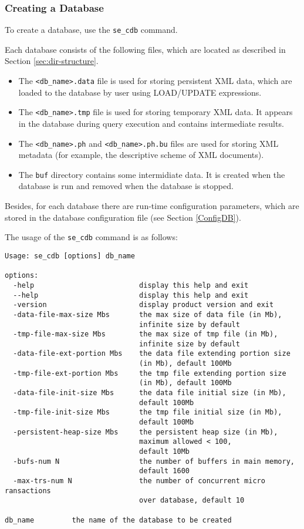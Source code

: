 \documentclass[a4paper,12pt]{article}
\begin{document}
\subsubsection{Creating a Database}
\label{CreateDB}
To create a database, use the \verb!se_cdb! command.

Each database consists of the following files, which are located as described in Section \ref{sec:dir-structure}.

\begin{itemize}
\item The \verb!<db_name>.data! file is used for storing persistent XML data, which are loaded to the database by user using LOAD/UPDATE expressions. 
\item The \verb!<db_name>.tmp! file is used for storing temporary XML data. It appears in the database during query execution and contains intermediate results.
\item The \verb!<db_name>.ph! and \verb!<db_name>.ph.bu! files are used for storing XML metadata (for example, the descriptive scheme of XML documents).
\item The \verb!buf! directory contains some intermidiate data. It is created when the database is run and removed when the database is stopped.
\end{itemize}

Besides, for each database there are run-time configuration parameters, which are stored in the database configuration file (see Section \ref{ConfigDB}).

The usage of the \verb!se_cdb! command is as follows:

\begin{verbatim}
Usage: se_cdb [options] db_name

options:
  -help                         display this help and exit
  --help                        display this help and exit
  -version                      display product version and exit
  -data-file-max-size Mbs       the max size of data file (in Mb),
                                infinite size by default
  -tmp-file-max-size Mbs        the max size of tmp file (in Mb),
                                infinite size by default
  -data-file-ext-portion Mbs    the data file extending portion size 
                                (in Mb), default 100Mb
  -tmp-file-ext-portion Mbs     the tmp file extending portion size
                                (in Mb), default 100Mb
  -data-file-init-size Mbs      the data file initial size (in Mb),
                                default 100Mb
  -tmp-file-init-size Mbs       the tmp file initial size (in Mb),
                                default 100Mb
  -persistent-heap-size Mbs     the persistent heap size (in Mb),
                                maximum allowed < 100,
                                default 10Mb
  -bufs-num N                   the number of buffers in main memory,
                                default 1600
  -max-trs-num N                the number of concurrent micro ransactions
                                over database, default 10

db_name         the name of the database to be created
\end{verbatim}
\end{document}
